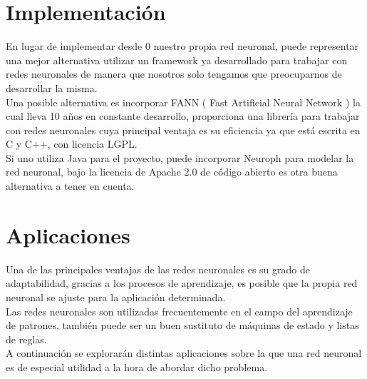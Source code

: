 \documentclass[11pt, oneside]{article}   	%
\begin{document}
\section{Implementación}

En lugar de implementar desde 0 nuestro propia red neuronal, puede representar una mejor alternativa utilizar un
framework ya desarrollado para trabajar con redes neuronales de manera que nosotros solo tengamos que preocuparnos de
desarrollar la misma.\\

Una posible alternativa es incorporar FANN ( Fast Artificial Neural Network ) la cual lleva 10 años en constante
desarrollo, proporciona una librería para trabajar con redes neuronales cuya principal ventaja es su eficiencia ya que
está escrita en C y C++, con licencia LGPL.\\

Si uno utiliza Java para el proyecto, puede incorporar Neuroph para modelar la red neuronal, bajo la licencia de Apache
2.0 de código abierto es otra buena alternativa a tener en cuenta.\\

\section{Aplicaciones}

Una de las principales ventajas de las redes neuronales es su grado de adaptabilidad, gracias a los procesos de
aprendizaje, es posible que la propia red neuronal se ajuste para la aplicación determinada.\\

Las redes neuronales son utilizadas frecuentemente en el campo del aprendizaje de patrones, también puede ser un buen
sustituto de máquinas de estado y listas de reglas.\\

A continuación se explorarán distintas aplicaciones sobre la que una red neuronal es de especial utilidad a la hora de abordar dicho problema.\\
\end{document}
